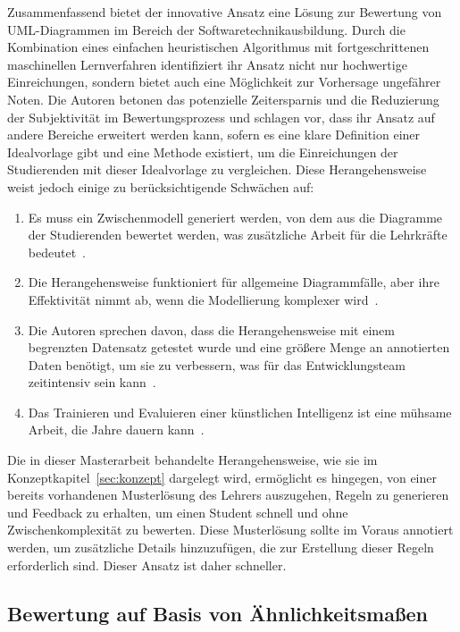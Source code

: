 Zusammenfassend bietet der innovative Ansatz eine Lösung zur Bewertung von UML-Diagrammen im Bereich
der Softwaretechnikausbildung. Durch die Kombination eines einfachen heuristischen Algorithmus mit fortgeschrittenen
maschinellen Lernverfahren identifiziert ihr Ansatz nicht nur hochwertige Einreichungen, sondern bietet auch eine
Möglichkeit zur Vorhersage ungefährer Noten. Die Autoren betonen das potenzielle Zeitersparnis und die Reduzierung der
Subjektivität im Bewertungsprozess und schlagen vor, dass ihr Ansatz auf andere Bereiche erweitert werden kann,
sofern es eine klare Definition einer Idealvorlage gibt und eine Methode existiert, um die Einreichungen der
Studierenden mit dieser Idealvorlage zu vergleichen. Diese Herangehensweise weist jedoch einige zu berücksichtigende
Schwächen auf:

\begin{enumerate}
    \item Es muss ein Zwischenmodell generiert werden, von dem aus die Diagramme der Studierenden bewertet werden,
    was zusätzliche Arbeit für die Lehrkräfte bedeutet~\cite{boubekeur2020automatic}.
    \item Die Herangehensweise funktioniert für allgemeine Diagrammfälle, aber ihre Effektivität nimmt ab, wenn die
    Modellierung komplexer wird~\cite{boubekeur2020automatic}.
    \item Die Autoren sprechen davon, dass die Herangehensweise mit einem begrenzten Datensatz getestet wurde und
    eine größere Menge an annotierten Daten benötigt, um sie zu verbessern, was für das
    Entwicklungsteam zeitintensiv sein kann~\cite{boubekeur2020automatic}.
    \item Das Trainieren und Evaluieren einer künstlichen Intelligenz ist eine mühsame Arbeit, die Jahre dauern kann~\cite{boubekeur2020automatic}.
\end{enumerate}

Die in dieser Masterarbeit behandelte Herangehensweise, wie sie im Konzeptkapitel~\ref{sec:konzept} dargelegt wird,
ermöglicht es hingegen, von einer bereits vorhandenen Musterlösung des Lehrers auszugehen, Regeln zu generieren und
Feedback zu erhalten, um einen Student schnell und ohne Zwischenkomplexität zu bewerten. Diese Musterlösung sollte im
Voraus annotiert werden, um zusätzliche Details hinzuzufügen, die zur Erstellung dieser Regeln erforderlich sind. Dieser
Ansatz ist daher schneller.


\subsection{Bewertung auf Basis von Ähnlichkeitsmaßen}

